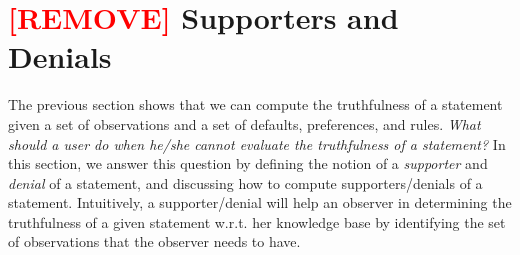 \documentclass{article}
\def\executable{\:\: \texttt{executable if} \:\:}
\newcommand{\causesif}[1]{\:\: \texttt{causes} \:\: {#1} \:\: \texttt{if} \:\:}
\begin{document}
% 
% 
%          
% 
% 
% 
 
 

\section{\textcolor{red}{[REMOVE]} Supporters and Denials} 

The previous section shows that we can compute the truthfulness of a statement given 
a set of observations and a set of defaults, preferences, and rules. {\em What should a user do 
when he/she cannot evaluate the truthfulness of a statement?}   
In this section, we answer this question by defining the notion of a \emph{supporter}
and \emph{denial} of a statement,
and discussing how to compute supporters/denials of a statement.
Intuitively, a supporter/denial will help an observer in determining the truthfulness of 
a given statement w.r.t. her knowledge base by identifying the set of 
observations that the observer needs to have. 
\end{document}
